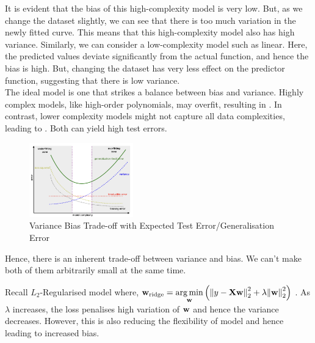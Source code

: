 It is evident that the bias of this high-complexity model is very low. But, as we change the dataset slightly, we can see that there is too much variation in the newly fitted curve. This means that this high-complexity model also has high variance. Similarly, we can consider a low-complexity model such as linear. Here, the predicted values deviate significantly from the actual function, and hence the bias is high. But, changing the dataset has very less effect on the predictor function, suggesting that there is low variance. \\

The ideal model is one that strikes a balance between bias and variance. Highly complex models, like high-order polynomials, may overfit, resulting in . In contrast, lower complexity models might not capture all data complexities, leading to . Both can yield high test errors.

\begin{figure}[H]
  \centering
  \includegraphics[width = 0.4\textwidth]{images/16.png}
  \caption{Variance Bias Trade-off with Expected Test Error/Generalisation Error}
\end{figure}

Hence, there is an inherent trade-off between variance and bias. We can't make both of them arbitrarily small at the same time. \\

\begin{mdframed}
  Recall $L_2$-Regularised model where,
  $
    \mathbf{w}_{\text{ridge}} = \underset{\mathbf{w}}{\arg\min}
    \left(\norm{y - \mathbf{X}\mathbf{w}}_2^2 + \lambda\norm{\mathbf{w}}_2^2\right)
  $
  . As $\lambda$ increases, the loss penalises high variation of $\mathbf{w}$ and hence the variance decreases. However, this is also reducing the flexibility of model and hence leading to increased bias.
\end{mdframed}